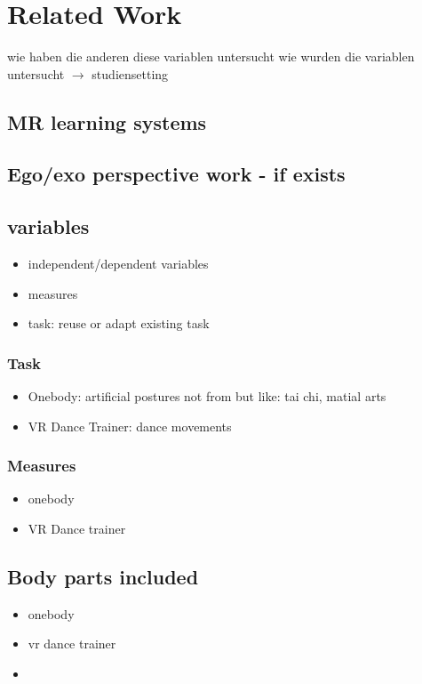 \chapter{Related Work}
wie haben die anderen diese variablen untersucht
wie wurden die variablen untersucht $\rightarrow$ studiensetting
\section{MR learning systems}


\section{Ego/exo perspective work - if exists}

\section{variables}
\begin{itemize}
	\item independent/dependent variables
	\item measures
	\item task: reuse or adapt existing task
\end{itemize}
\subsection{Task}
\begin{itemize}
	\item Onebody: artificial postures not from but like: tai chi, matial arts
	\item VR Dance Trainer: dance movements
\end{itemize}
\subsection{Measures}
\begin{itemize}
	\item onebody
	\item VR Dance trainer
\end{itemize}
\section{Body parts included}
\begin{itemize}
	\item onebody
	\item vr dance trainer
	\item 
\end{itemize}

